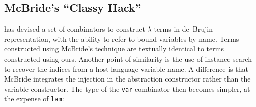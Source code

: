\documentclass[9pt,authoryear]{sigplanconf}
\begin{document}
\subsection{McBride{'}s {``}Classy Hack{''}}

%
\citet{mcbride_not_2010} has devised a set of combinators to
    construct $ \lambda $-terms in de{~}Brujin representation, with the ability to
    refer to bound variables by name. Terms constructed using McBride{'}s
    technique are textually identical to terms constructed using ours.
    Another point of similarity is the use of instance search to recover
    the indices from a host-language variable name. A difference is that
    McBride integrates the injection in the abstraction constructor
    rather than the variable constructor. The type of the \texttt{var}    combinator then becomes simpler, at the expense of \texttt{lam}{:}%


%
%


{\nopagebreak }
\end{document}
